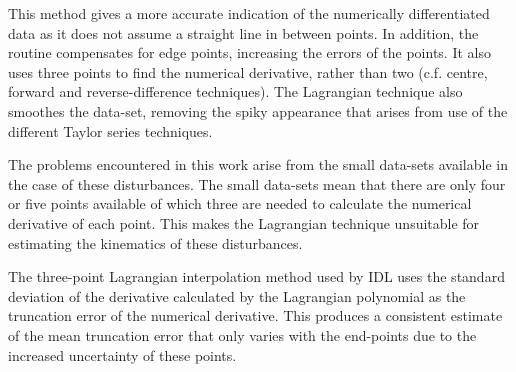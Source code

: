 \documentclass[namedreferences]{SolarPhysics}
\begin{document}
\begin{article}
This method gives a more accurate indication of the numerically differentiated data as it does not assume a straight line in between points. In addition, the routine compensates for edge points, increasing the errors of the points. It also uses three points to find the numerical derivative, rather than two (c.f. centre, forward and reverse-difference techniques). The Lagrangian technique also smoothes the data-set, removing the spiky appearance that arises from use of the different Taylor series techniques.


 The problems encountered in this work arise from the small data-sets available in the case of these disturbances. The small data-sets mean that there are only four or five points available of which three are needed to calculate the numerical derivative of each point. This makes the Lagrangian technique unsuitable for estimating the kinematics of these disturbances.

The three-point Lagrangian interpolation method used by IDL uses the standard deviation of the derivative calculated by the Lagrangian polynomial as the truncation error of the numerical derivative. This produces a consistent estimate of the mean truncation error that only varies with the end-points due to the increased uncertainty of these points.


\end{article}
\end{document}

